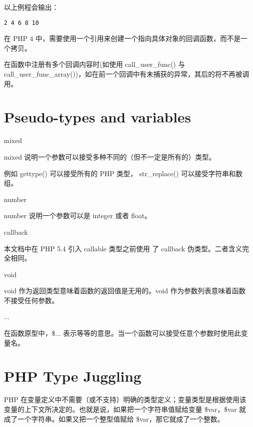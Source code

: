 以上例程会输出：

\begin{verbatim}
2 4 6 8 10
\end{verbatim}


在 PHP 4 中，需要使用一个引用来创建一个指向具体对象的回调函数，而不是一个拷贝。

在函数中注册有多个回调内容时(如使用 call\_user\_func() 与 call\_user\_func\_array())，如在前一个回调中有未捕获的异常，其后的将不再被调用。


\section{Pseudo-types and variables}


\begin{compactitem}
\item mixed

mixed 说明一个参数可以接受多种不同的（但不一定是所有的）类型。

例如 gettype() 可以接受所有的 PHP 类型， str\_replace() 可以接受字符串和数组。

\item number

number 说明一个参数可以是 integer 或者 float。

\item callback

本文档中在 PHP 5.4 引入 callable 类型之前使用 了 callback 伪类型。二者含义完全相同。

\item void

void 作为返回类型意味着函数的返回值是无用的。void 作为参数列表意味着函数不接受任何参数。

\item ... 

在函数原型中，\$... 表示等等的意思。当一个函数可以接受任意个参数时使用此变量名。

\end{compactitem}



\section{PHP Type Juggling}


PHP 在变量定义中不需要（或不支持）明确的类型定义；变量类型是根据使用该变量的上下文所决定的。也就是说，如果把一个字符串值赋给变量 \$var，\$var 就成了一个字符串。如果又把一个整型值赋给 \$var，那它就成了一个整数。

